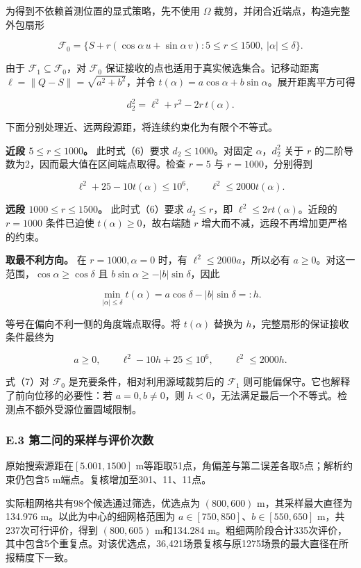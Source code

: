 \documentclass[UTF8,fontset=none,zihao=-4,a4paper]{ctexart}
\begin{document}
为得到不依赖首测位置的显式策略，先不使用 \(\Omega\) 裁剪，并闭合近端点，构造完整外包扇形

\[
\mathcal F_0=\{S+r(\cos\alpha\,u+\sin\alpha\,v):
5\le r\le1500,\ |\alpha|\le\delta\}.
\]

由于 \(\mathcal F_1\subseteq\mathcal F_0\)，对 \(\mathcal F_0\) 保证接收的点也适用于真实候选集合。记移动距离 \(\ell=\|Q-S\|=\sqrt{a^2+b^2}\)，并令 \(t(\alpha)=a\cos\alpha+b\sin\alpha\)。展开距离平方可得

\[
d_2^2=\ell^2+r^2-2r\,t(\alpha).
\]

下面分别处理近、远两段源距，将连续约束化为有限个不等式。

\textbf{近段 \(5\le r\le1000\)。} 此时式（6）要求 \(d_2\le1000\)。对固定 \(\alpha\)，\(d_2^2\) 关于 \(r\) 的二阶导数为2，因而最大值在区间端点取得。检查 \(r=5\) 与 \(r=1000\)，分别得到

\[
\ell^2+25-10t(\alpha)\le10^6,\qquad
\ell^2\le2000t(\alpha).
\]

\textbf{远段 \(1000\le r\le1500\)。} 此时式（6）要求 \(d_2\le r\)，即 \(\ell^2\le2rt(\alpha)\)。近段的 \(r=1000\) 条件已迫使 \(t(\alpha)\ge0\)，故右端随 \(r\) 增大而不减，远段不再增加更严格的约束。

\textbf{取最不利方向。} 在 \(r=1000,\alpha=0\) 时，有 \(\ell^2\le2000a\)，所以必有 \(a\ge0\)。对这一范围，\(\cos\alpha\ge\cos\delta\) 且 \(b\sin\alpha\ge-|b|\sin\delta\)，因此

\[
\min_{|\alpha|\le\delta}t(\alpha)
=a\cos\delta-|b|\sin\delta=:h.
\]

等号在偏向不利一侧的角度端点取得。将 \(t(\alpha)\) 替换为 \(h\)，完整扇形的保证接收条件最终为

\[
\boxed{a\ge0,\qquad \ell^2-10h+25\le10^6,\qquad
\ell^2\le2000h.}
\]

式（7）对 \(\mathcal F_0\) 是充要条件，相对利用源域裁剪后的 \(\mathcal F_1\) 则可能偏保守。它也解释了前向位移的必要性：若 \(a=0,b\ne0\)，则 \(h<0\)，无法满足最后一个不等式。检测点不额外受源位置圆域限制。

\subsubsection{E.3 第二问的采样与评价次数}\label{e.3-ux7b2cux4e8cux95eeux7684ux91c7ux6837ux4e0eux8bc4ux4ef7ux6b21ux6570}

原始搜索源距在\([5.001,1500]\) m等距取51点，角偏差与第二误差各取5点；解析约束仍包含5 m端点。复核增加至301、11、11点。

实际粗网格共有98个候选通过筛选，优选点为 \((800,600)\) m，其采样最大直径为134.976 m。以此为中心的细网格范围为 \(a\in[750,850]\)、\(b\in[550,650]\) m，共237次可行评价，得到 \((800,605)\) m和134.284 m。粗细两阶段合计335次评价，其中包含5个重复点。对该优选点，36,421场景复核与原1275场景的最大直径在所报精度下一致。
\end{document}
